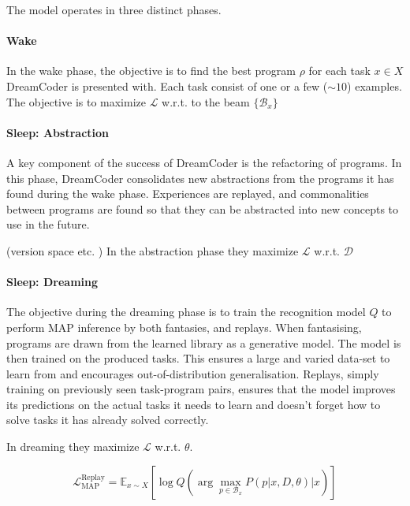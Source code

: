 The model operates in three distinct phases. 

\paragraph{Wake} In the wake phase, the objective is to find the best program $\rho$ for each task $x \in X$ DreamCoder is presented with. Each task consist of one or a few ($\sim10$) examples.
The objective is to maximize \(\mathcal{L}\) w.r.t. to the beam \(\{\mathcal{B}_x\}\)

\paragraph{Sleep: Abstraction} A key component of the success of DreamCoder is the refactoring of programs. In this phase, DreamCoder consolidates new abstractions from the programs it has found during the wake phase. Experiences are replayed, and commonalities between programs are found so that they can be abstracted into new concepts to use in the future. 

(version space etc. )
In the abstraction phase they maximize \(\mathcal{L}\) w.r.t. \(\mathcal{D}\)

\paragraph{Sleep: Dreaming} The objective during the dreaming phase is to train the recognition model $Q$ to perform MAP inference by both fantasies, and replays. When fantasising, programs are drawn from the learned library as a generative model. The model is then trained on the produced tasks. This ensures a large and varied data-set to learn from and encourages out-of-distribution generalisation. Replays, simply training on previously seen task-program pairs, ensures that the model improves its predictions on the actual tasks it needs to learn and doesn't forget how to solve tasks it has already solved correctly.

In dreaming they maximize \(\mathcal{L}\) w.r.t. \(\theta\).

\[
    \mathcal{L}_{\text{MAP}}^{\text{Replay}} = \mathbb{E}_{x\sim X} \left[ \log Q \left( \arg\max_{p \in \mathcal{B}_x} P(p|x, D, \theta)  \Big\lvert x \right) \right]
\]

